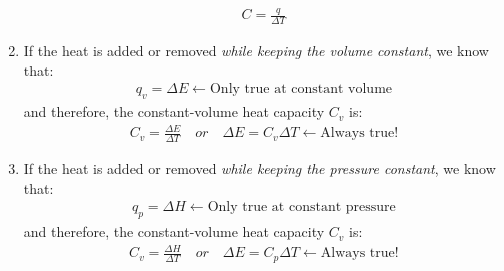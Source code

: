 \documentclass[../CHEM152Notes.tex]{subfiles}
\begin{document}
\begin{enumerate}
        \begin{equation*}
            \begin{aligned}
                C = \frac{q}{\Delta T}
            \end{aligned}
        \end{equation*}
    \item If the heat is added or removed \emph{while keeping the volume constant}, we know that:
        \begin{equation*}
            \begin{aligned}
                q_v = \Delta E \leftarrow\text{Only true at constant volume}
            \end{aligned}
        \end{equation*}
        and therefore, the constant-volume heat capacity $C_v$ is:
        \begin{equation*}
            \begin{aligned}
                C_v = \frac{\Delta E}{\Delta T} \quad or \quad \Delta E = C_v \Delta T \leftarrow\text{Always true!}
            \end{aligned}
        \end{equation*}
    \item If the heat is added or removed \emph{while keeping the pressure constant}, we know that:
    \begin{equation*}
        \begin{aligned}
            q_p = \Delta H \leftarrow\text{Only true at constant pressure}
        \end{aligned}
    \end{equation*}
    and therefore, the constant-volume heat capacity $C_v$ is:
    \begin{equation*}
        \begin{aligned}
            C_v = \frac{\Delta H}{\Delta T} \quad or \quad \Delta E = C_p \Delta T \leftarrow\text{Always true!}
        \end{aligned}
    \end{equation*}
\end{enumerate}
\end{document}
